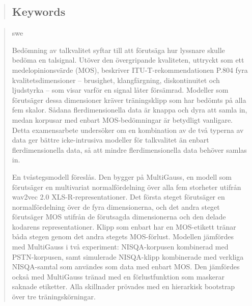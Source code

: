 \documentclass[
english,                 %
bibtex,                  %
includeExtraAbstracts, %
]{kththesis}
\numberwithin{listing}{chapter}
\begin{document}
\begin{abstract}
\subsection*{Keywords}
\begin{scontents}[store-env=keywords,print-env=true]
\end{scontents}
\end{abstract}
\cleardoublepage
{}
\begin{abstract}
    \markboth{\abstractname}{}
\begin{scontents}[store-env=lang]
swe
\end{scontents}
\begin{scontents}[store-env=abstracts,print-env=true]
Bedömning av talkvalitet syftar till att förutsäga hur lyssnare skulle bedöma en talsignal. Utöver den övergripande kvaliteten, uttryckt som ett medelopinionsvärde (MOS), beskriver ITU-T-rekommendationen P.804 fyra kvalitetsdimensioner -- brusighet, klangfärgning, diskontinuitet och ljudstyrka -- som visar varför en signal låter försämrad. Modeller som förutsäger dessa dimensioner kräver träningsklipp som har bedömts på alla fem skalor. Sådana flerdimensionella data är knappa och dyra att samla in, medan korpusar med enbart MOS-bedömningar är betydligt vanligare. Detta examensarbete undersöker om en kombination av de två typerna av data ger bättre icke-intrusiva modeller för talkvalitet än enbart flerdimensionella data, så att mindre flerdimensionella data behöver samlas in.

En tvåstegsmodell föreslås. Den bygger på MultiGauss, en modell som förutsäger en multivariat normalfördelning över alla fem storheter utifrån wav2vec 2.0 XLS-R-representationer. Det första steget förutsäger en normalfördelning över de fyra dimensionerna, och det andra steget förutsäger MOS utifrån de förutsagda dimensionerna och den delade kodarens representationer. Klipp som enbart har en MOS-etikett tränar båda stegen genom det andra stegets MOS-förlust. Modellen jämfördes med MultiGauss i två experiment: NISQA-korpusen kombinerad med PSTN-korpusen, samt simulerade NISQA-klipp kombinerade med verkliga NISQA-samtal som användes som data med enbart MOS. Den jämfördes också med MultiGauss tränad med en förlustfunktion som maskerar saknade etiketter. Alla skillnader prövades med en hierarkisk bootstrap över tre träningskörningar.


\end{scontents}
\end{abstract}
\end{document}

